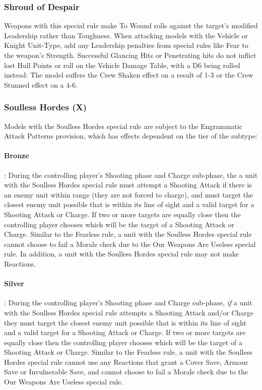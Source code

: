 \begin{multicols}{2}
\subsubsection{Shroud of Despair} \label{Shroud of Despair}

Weapons with this special rule make To Wound rolls against the target's modified Leadership rather than Toughness. When attacking models with the Vehicle or Knight Unit-Type, add any Leadership penalties from special rules like Fear to the weapon's Strength. Successful Glancing Hits or Penetrating hits do not inflict lost Hull Points or roll on the Vehicle Damage Table, with a D6 being rolled instead: The model suffers the Crew Shaken effect on a result of 1-3 or the Crew Stunned effect on a 4-6.

\subsubsection{Soulless Hordes (X)} \label{Soulless Hordes}

Models with the Soulless Hordes special rule are subject to the Engrammatic Attack Patterns provision, which has effects dependent on the tier of the subtype:

\paragraph{Bronze}: During the controlling player's Shooting phase and Charge sub-phase, the a unit with the Soulless Hordes special rule must attempt a Shooting Attack if there is an enemy unit within range (they are not forced to charge), and must target the closest enemy unit possible that is within its line of sight and a valid target for a Shooting Attack or Charge. If two or more targets are equally close then the controlling player chooses which will be the target of a Shooting Attack or Charge. Similar to the Fearless rule, a unit with the Soulless Hordes special rule cannot choose to fail a Morale check due to the Our Weapons Are Useless special rule. In addition, a unit with the Soulless Hordes special rule may not make Reactions.

\paragraph{Silver}: During the controlling player's Shooting phase and Charge sub-phase, \textit{if} a unit with the Soulless Hordes special rule attempts a Shooting Attack and/or Charge they must target the closest enemy unit possible that is within its line of sight and a valid target for a Shooting Attack or Charge. If two or more targets are equally close then the controlling player chooses which will be the target of a Shooting Attack or Charge. Similar to the Fearless rule, a unit with the Soulless Hordes special rule cannot use any Reactions that grant a Cover Save, Armour Save or Invulnerable Save, and cannot choose to fail a Morale check due to the Our Weapons Are Useless special rule.


\end{multicols}
